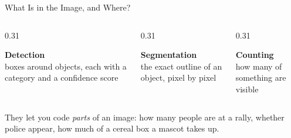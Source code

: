 \newcommand{\coursemodule}{Module 12}





\begin{frame}{What Is in the Image, and Where?}
\begin{columns}[T]
\begin{column}{0.31\textwidth}
\begin{graybox}[height=3.2cm]
\raggedright\textbf{Detection}\\
boxes around objects, each with a category and a confidence score
\end{graybox}
\end{column}
\begin{column}{0.31\textwidth}
\begin{greenbox}[height=3.2cm]
\raggedright\textbf{Segmentation}\\
the exact outline of an object, pixel by pixel
\end{greenbox}
\end{column}
\begin{column}{0.31\textwidth}
\begin{navybox}[height=3.2cm]
\raggedright\textbf{Counting}\\
how many of something are visible
\end{navybox}
\end{column}
\end{columns}

\vspace{0.25cm}
They let you code \emph{parts} of an image: how many people are at a rally, whether police appear,
how much of a cereal box a mascot takes up.
\end{frame}

